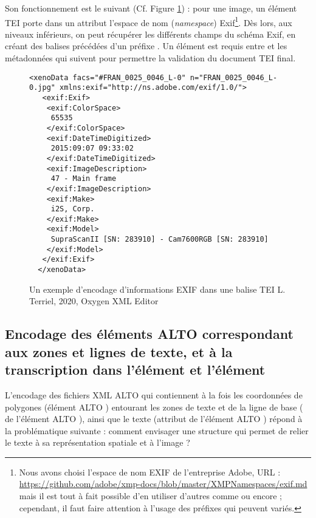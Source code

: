 Son fonctionnement est le suivant (Cf. Figure \ref{fig:sortie_exif_xml}) : pour une image, un élément TEI  porte dans un attribut  l'espace de nom (\textit{namespace}) Exif\footnote{Nous avons choisi l'espace de nom EXIF de l'entreprise Adobe, URL : \url{https://github.com/adobe/xmp-docs/blob/master/XMPNamespaces/exif.md} mais il est tout à fait possible d'en utiliser d'autres comme  ou encore ; cependant, il faut faire attention à l'usage des préfixes qui peuvent variés.}. Dès lors, aux niveaux inférieurs, on peut récupérer les différents champs du schéma Exif, en créant des balises précédées d'un préfixe . Un élément  est requis entre  et les métadonnées qui suivent pour permettre la validation du document TEI final.

\begin{figure}[h]
\lstset{language=XML}
\begin{lstlisting}
<xenoData facs="#FRAN_0025_0046_L-0" n="FRAN_0025_0046_L-0.jpg" xmlns:exif="http://ns.adobe.com/exif/1.0/">
   <exif:Exif>
    <exif:ColorSpace>
     65535
    </exif:ColorSpace>
    <exif:DateTimeDigitized>
     2015:09:07 09:33:02
    </exif:DateTimeDigitized>
    <exif:ImageDescription>
     47 - Main frame
    </exif:ImageDescription>
    <exif:Make>
     i2S, Corp.
    </exif:Make>
    <exif:Model>
     SupraScanII [SN: 283910] - Cam7600RGB [SN: 283910]
    </exif:Model>
   </exif:Exif>
  </xenoData>
\end{lstlisting} 
\caption{Un exemple d'encodage d'informations EXIF dans une balise TEI   \textcopyright L. Terriel, 2020, Oxygen XML Editor}
\label{fig:sortie_exif_xml}
\end{figure}
\newpage

\subsection{Encodage des éléments ALTO correspondant aux zones et lignes de texte, et à la transcription dans l'élément  et l'élément }

L'encodage des fichiers XML ALTO qui contiennent à la fois les coordonnées de polygones (élément ALTO ) entourant les zones de texte et de la ligne de base ( de l'élément ALTO ), ainsi que le texte (attribut  de l'élément ALTO ) répond à la problématique suivante : comment envisager une structure qui permet de relier le texte à sa représentation spatiale et à l'image ?\\

